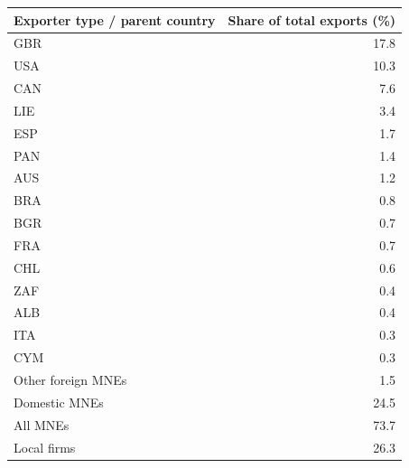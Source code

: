 \begin{tabular}{lr}
\toprule
Exporter type / parent country & Share of total exports (\%) \\
\midrule
GBR & 17.8 \\
USA & 10.3 \\
CAN & 7.6 \\
LIE & 3.4 \\
ESP & 1.7 \\
PAN & 1.4 \\
AUS & 1.2 \\
BRA & 0.8 \\
BGR & 0.7 \\
FRA & 0.7 \\
CHL & 0.6 \\
ZAF & 0.4 \\
ALB & 0.4 \\
ITA & 0.3 \\
CYM & 0.3 \\
Other foreign MNEs & 1.5 \\
Domestic MNEs & 24.5 \\
\midrule
All MNEs & 73.7 \\
Local firms & 26.3 \\
\bottomrule
\end{tabular}
